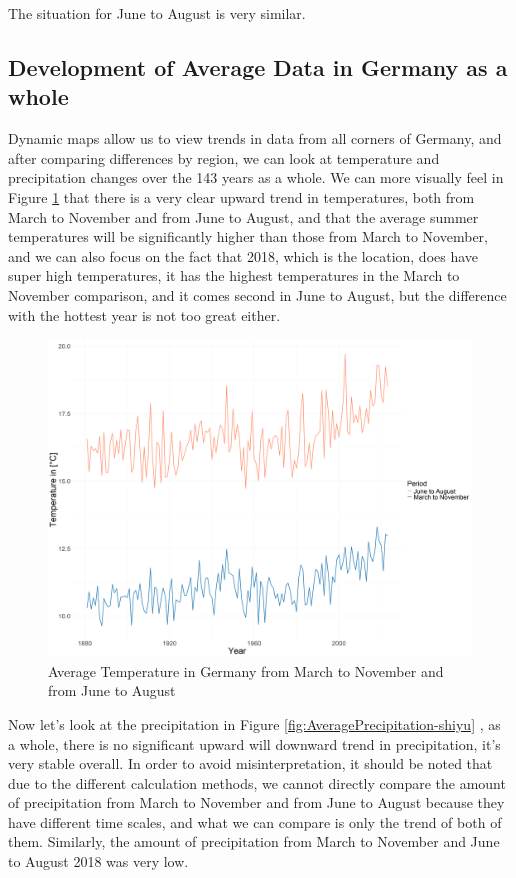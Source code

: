 \documentclass[
]{krantz}
\begin{document}
The situation for June to August is very similar.

\subsection{Development of Average Data in Germany as a whole}\label{development-shiyu}

Dynamic maps allow us to view trends in data from all corners of Germany, and after comparing differences by region, we can look at temperature and precipitation changes over the 143 years as a whole. We can more visually feel in Figure \ref{fig:AverageTemperature-shiyu} that there is a very clear upward trend in temperatures, both from March to November and from June to August, and that the average summer temperatures will be significantly higher than those from March to November, and we can also focus on the fact that 2018, which is the location, does have super high temperatures, it has the highest temperatures in the March to November comparison, and it comes second in June to August, but the difference with the hottest year is not too great either.

\begin{figure}

{\centering \includegraphics[width=0.7\linewidth]{work/03-compounds/figures/Temperature/Average/Temperature} 

}

\caption{Average Temperature in Germany from March to November and from June to August}\label{fig:AverageTemperature-shiyu}
\end{figure}

Now let's look at the precipitation in Figure \ref{fig:AveragePrecipitation-shiyu} , as a whole, there is no significant upward will downward trend in precipitation, it's very stable overall. In order to avoid misinterpretation, it should be noted that due to the different calculation methods, we cannot directly compare the amount of precipitation from March to November and from June to August because they have different time scales, and what we can compare is only the trend of both of them. Similarly, the amount of precipitation from March to November and June to August 2018 was very low.
\end{document}
